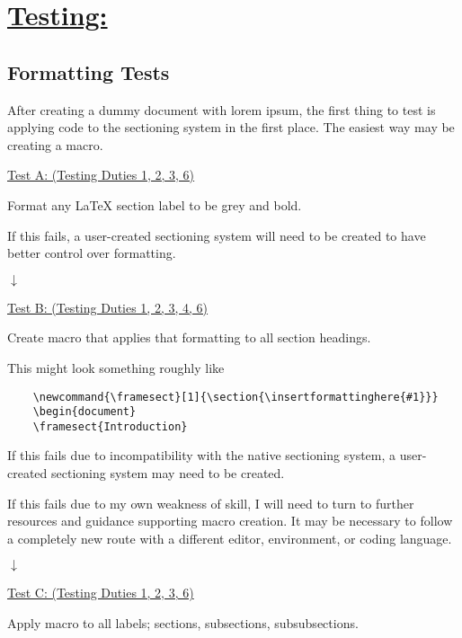 \documentclass[12pt]{article}
\begin{document}
\vspace{1em}
\section*{\underline{\Large{\textbf{Testing:}}}}

\subsection*{Formatting Tests}

After creating a dummy document with lorem ipsum, the first thing to test is applying code to the sectioning system in the first place. The easiest way may be creating a macro. 

\vspace{0.5em}
\underline{Test A: (Testing Duties 1, 2, 3, 6)}

Format any LaTeX section label to be grey and bold.

If this fails, a user-created sectioning system will need to be created to have better control over formatting.

$\downarrow$

\underline{Test B: (Testing Duties 1, 2, 3, 4, 6)}

Create macro that applies that formatting to all section headings.

This might look something roughly like 
\begin{verbatim}
    \newcommand{\framesect}[1]{\section{\insertformattinghere{#1}}}
    \begin{document}
    \framesect{Introduction}
\end{verbatim}

If this fails due to incompatibility with the native sectioning system, a user-created sectioning system may need to be created.

If this fails due to my own weakness of skill, I will need to turn to further resources and guidance supporting macro creation. It may be necessary to follow a completely new route with a different editor, environment, or coding language.

$\downarrow$

\underline{Test C: (Testing Duties 1, 2, 3, 6)}

Apply macro to all labels; sections, subsections, subsubsections.
\end{document}
